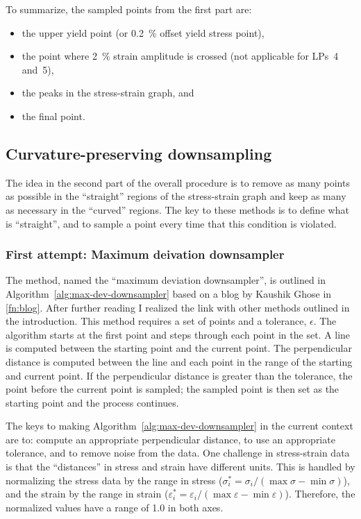 \documentclass[a4paper,11pt]{article}
\begin{document}
To summarize, the sampled points from the first part are:
\begin{itemize}
    \item the upper yield point (or 0.2~\% offset yield stress point),
    \item the point where 2~\% strain amplitude is crossed (not applicable for LPs~4 and~5),
    \item the peaks in the stress-strain graph, and
    \item the final point.
\end{itemize}

\subsection{Curvature-preserving downsampling}

The idea in the second part of the overall procedure is to remove as many points as possible in the ``straight'' regions of the stress-strain graph and keep as many as necessary in the ``curved'' regions.
The key to these methods is to define what is ``straight'', and to sample a point every time that this condition is violated.

\subsubsection{First attempt: Maximum deivation downsampler}

The method, named the ``maximum deviation downsampler'', is outlined in Algorithm~\ref{alg:max-dev-downsampler} based on a blog by Kaushik Ghose in \cref{fn:blog}.
After further reading I realized the link with other methods outlined in the introduction.
This method requires a set of points and a tolerance, $\epsilon$.
The algorithm starts at the first point and steps through each point in the set.
A line is computed between the starting point and the current point.
The perpendicular distance is computed between the line and each point in the range of the starting and current point.
If the perpendicular distance is greater than the tolerance, the point before the current point is sampled; the sampled point is then set as the starting point and the process continues.

The keys to making Algorithm~\ref{alg:max-dev-downsampler} in the current context are to: compute an appropriate perpendicular distance, to use an appropriate tolerance, and to remove noise from the data.
One challenge in stress-strain data is that the ``distances'' in stress and strain have different units.
This is handled by normalizing the stress data by the range in stress ($\sigma_i^* = \sigma_i / (\max \sigma - \min \sigma)$), and the strain by the range in strain ($\varepsilon_i^* = \varepsilon_i / (\max \varepsilon - \min \varepsilon)$).
Therefore, the normalized values have a range of 1.0 in both axes.
\end{document}
